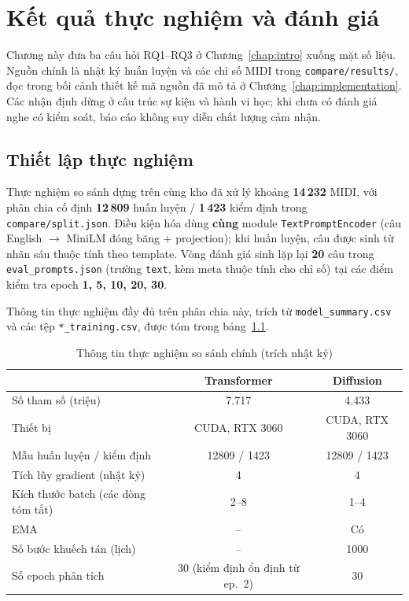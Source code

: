 \chapter{Kết quả thực nghiệm và đánh giá}
\label{chap:experiments}

Chương này đưa ba câu hỏi RQ1--RQ3 ở Chương~\ref{chap:intro} xuống mặt số liệu. Nguồn chính là nhật ký huấn luyện và các chỉ số MIDI trong \texttt{compare/results/}, đọc trong bối cảnh thiết kế mã nguồn đã mô tả ở Chương~\ref{chap:implementation}. Các nhận định dừng ở cấu trúc sự kiện và hành vi học; khi chưa có đánh giá nghe có kiểm soát, báo cáo không suy diễn chất lượng cảm nhận.

\section{Thiết lập thực nghiệm}
\label{sec:ch4-setup}

Thực nghiệm so sánh dựng trên cùng kho đã xử lý khoảng \textbf{14\,232} MIDI, với phân chia cố định \textbf{12\,809} huấn luyện / \textbf{1\,423} kiểm định trong \texttt{compare/split.json}. Điều kiện hóa dùng \textbf{cùng} module \texttt{TextPromptEncoder} (câu English $\rightarrow$ MiniLM đóng băng + projection); khi huấn luyện, câu được sinh từ nhãn sáu thuộc tính theo template. Vòng đánh giá sinh lặp lại \textbf{20} câu trong \texttt{eval\_prompts.json} (trường \texttt{text}, kèm meta thuộc tính cho chỉ số) tại các điểm kiểm tra epoch \textbf{1, 5, 10, 20, 30}.

Thông tin thực nghiệm đầy đủ trên phân chia này, trích từ \texttt{model\_summary.csv} và các tệp \texttt{*\_training.csv}, được tóm trong bảng~\ref{tab:ch4-setup}.

\begin{table}[htbp]
\centering
\caption{Thông tin thực nghiệm so sánh chính (trích nhật ký)}
\label{tab:ch4-setup}
\small
\begin{tabular}{lcc}
\toprule
 & \textbf{Transformer} & \textbf{Diffusion} \\
\midrule
Số tham số (triệu) & 7.717 & 4.433 \\
Thiết bị & CUDA, RTX 3060 & CUDA, RTX 3060 \\
Mẫu huấn luyện / kiểm định & 12809 / 1423 & 12809 / 1423 \\
Tích lũy gradient (nhật ký) & 4 & 4 \\
Kích thước batch (các dòng tóm tắt) & 2--8 & 1--4 \\
EMA & -- & Có \\
Số bước khuếch tán (lịch) & -- & 1000 \\
Số epoch phân tích & 30 (kiểm định ổn định từ ep.\ 2) & 30 \\
\bottomrule
\end{tabular}
\end{table}

